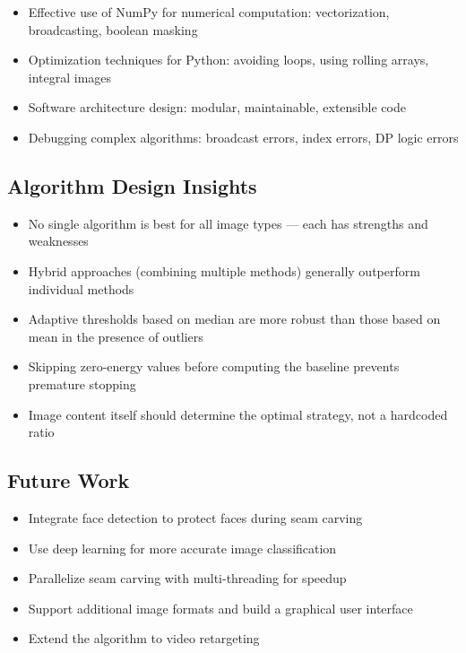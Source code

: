 \documentclass[12pt,a4paper]{article}
\begin{document}
\begin{itemize}
    \item Effective use of NumPy for numerical computation: vectorization, broadcasting, boolean masking
    \item Optimization techniques for Python: avoiding loops, using rolling arrays, integral images
    \item Software architecture design: modular, maintainable, extensible code
    \item Debugging complex algorithms: broadcast errors, index errors, DP logic errors
\end{itemize}

\subsection{Algorithm Design Insights}

\begin{itemize}
    \item No single algorithm is best for all image types — each has strengths and weaknesses
    \item Hybrid approaches (combining multiple methods) generally outperform individual methods
    \item Adaptive thresholds based on median are more robust than those based on mean in the presence of outliers
    \item Skipping zero-energy values before computing the baseline prevents premature stopping
    \item Image content itself should determine the optimal strategy, not a hardcoded ratio
\end{itemize}

\subsection{Future Work}

\begin{itemize}
    \item Integrate face detection to protect faces during seam carving
    \item Use deep learning for more accurate image classification
    \item Parallelize seam carving with multi-threading for speedup
    \item Support additional image formats and build a graphical user interface
    \item Extend the algorithm to video retargeting
\end{itemize}
\end{document}
